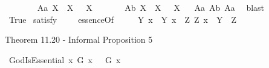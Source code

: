 \begin{isabellebody}
\begin{isamarkuptext}
\end{isamarkuptext}\isamarkuptrue%
\isamarkupfalse%
\ \isanewline
\ \ \ \ \ \ A{}a{\isacharcolon}\ {\isachardoublequoteopen}{\isasymlfloor}\isactrlbold {\isasymforall}X{\isachardot}\ {\isasymP}\ X\ \isactrlbold {\isasymrightarrow}\ \isactrlbold {\isasymbox}{\isacharparenleft}{\isasymP}\ X{\isacharparenright}{\isasymrfloor}{\isachardoublequoteclose}\ \ \ \ \ \ %
\isanewline
{}\isamarkupfalse%
\ A{}b{\isacharcolon}\ {\isachardoublequoteopen}{\isasymlfloor}\isactrlbold {\isasymforall}X{\isachardot}\ \isactrlbold {\isasymnot}{\isacharparenleft}{\isasymP}\ X{\isacharparenright}\ \isactrlbold {\isasymrightarrow}\ \isactrlbold {\isasymbox}\isactrlbold {\isasymnot}{\isacharparenleft}{\isasymP}\ X{\isacharparenright}{\isasymrfloor}{\isachardoublequoteclose}%
\isadelimproof
\ %
\endisadelimproof
%
\isatagproof
{}\isamarkupfalse%
\ A{}a\ A{}b\ A{}a\ \isamarkupfalse%
\ blast%
\endisatagproof
{\isafoldproof}%
%
\isadelimproof
%
\endisadelimproof
\isanewline
\ \ \ \ \isanewline
{}\isamarkupfalse%
\ True\ \isamarkupfalse%
{\isacharbrackleft}satisfy{\isacharbrackright}%
\isadelimproof
\ %
\endisadelimproof
%
\isatagproof
{}\isamarkupfalse%
\ %
%
\endisatagproof
{\isafoldproof}%
%
\isadelimproof
%
\endisadelimproof
\isanewline
\isanewline
{}\isamarkupfalse%
\ essenceOf{\isacharcolon}{\isacharcolon}{\isachardoublequoteopen}{\isasymup}{\isasymlangle}{\isasymlangle}{\isasymzero}{\isasymrangle}{\isacharcomma}{\isasymzero}{\isasymrangle}{\isachardoublequoteclose}\ {\isacharparenleft}{\isachardoublequoteopen}{\isasymE}{\isachardoublequoteclose}{\isacharparenright}\ \isanewline
\ \ {\isachardoublequoteopen}{\isasymE}\ Y\ x\ {\isasymequiv}\ {\isasymlparr}Y\ x{\isasymrparr}\ \isactrlbold {\isasymand}\ {\isacharparenleft}\isactrlbold {\isasymforall}Z{\isacharcolon}{\isacharcolon}{\isasymlangle}{\isasymzero}{\isasymrangle}{\isachardot}\ {\isasymlparr}Z\ x{\isasymrparr}\ \isactrlbold {\isasymrightarrow}\ Y\ {\isasymRrightarrow}\ Z{\isacharparenright}{\isachardoublequoteclose}%
\begin{isamarkuptext}%
Theorem 11.20 - Informal Proposition 5%
\end{isamarkuptext}\isamarkuptrue%
\isamarkupfalse%
\ GodIsEssential{\isacharcolon}\ {\isachardoublequoteopen}{\isasymlfloor}\isactrlbold {\isasymforall}x{\isachardot}\ G\ x\ \isactrlbold {\isasymrightarrow}\ {\isacharparenleft}{\isacharparenleft}{\isasymE}\ {\isasymdown}G{\isacharparenright}\ x{\isacharparenright}{\isasymrfloor}{\isachardoublequoteclose}%

\end{isabellebody}
